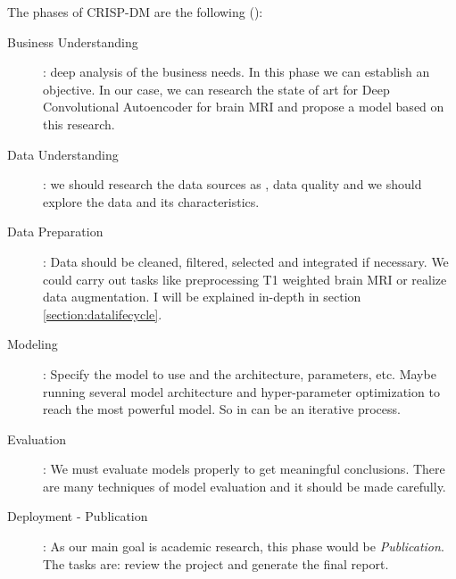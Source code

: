 The phases of CRISP-DM \cite{crisp} are the following ():
\begin{description}
    \item[Business Understanding]: deep analysis of the business needs. In this phase we can establish an objective. In our case, we can research the state of art for Deep Convolutional Autoencoder for brain MRI and propose a model based on this research.
    \item[Data Understanding]: we should research the data sources as  , data quality and we should explore the data and its characteristics.
    \item[Data Preparation]: Data should be cleaned, filtered, selected and integrated if necessary. We could carry out tasks like preprocessing T1 weighted brain MRI or realize data augmentation. I will be explained in-depth in section \ref{section:datalifecycle}.
    \item[Modeling]: Specify the model to use and the architecture, parameters, etc. Maybe running several model architecture and hyper-parameter optimization to reach the most powerful model. So in can be an iterative process.
    \item[Evaluation]: We must evaluate models properly to get meaningful conclusions. There are many techniques of model evaluation and it should be made carefully.
    \item[Deployment - Publication]: As our main goal is academic research, this phase would be \textit{Publication}. The tasks are: review the project and generate the final report.
\end{description}
